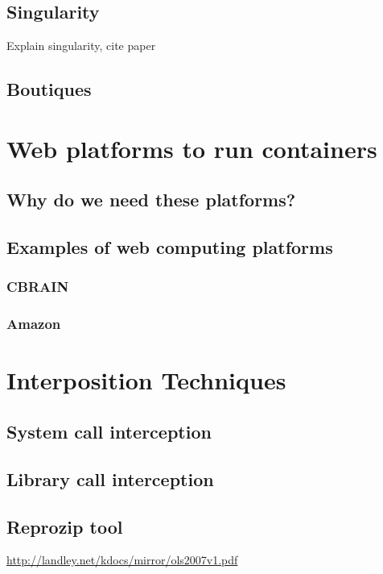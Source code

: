 \subsection{Singularity}
Explain singularity, cite paper
\subsection{Boutiques}

\section{Web platforms to run containers}
\subsection{Why do we need these platforms?}
\subsection{Examples of web computing platforms}
\subsubsection{CBRAIN}
\subsubsection{Amazon}

\section{Interposition Techniques}
\subsection{System call interception}
\subsection{Library call interception}
\subsection{Reprozip tool}
\hyperref[System Call Interception]{http://landley.net/kdocs/mirror/ols2007v1.pdf}

